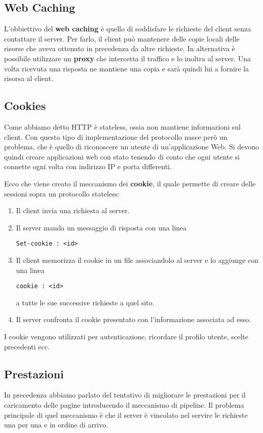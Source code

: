 \subsection{Web Caching}
L'obbiettivo del \textbf{web caching} è quello di soddisfare le 
richieste del client senza contattare il server. Per farlo, il client 
può mantenere delle copie locali delle risorse che aveva ottenuto in 
precedenza da altre richieste.
In alternativa è possibile utilizzare un \textbf{proxy} che intercetta 
il traffico e lo inoltra al server. Una volta ricevuta una risposta ne 
mantiene una copia e sarà quindi lui a fornire la risorsa al client.

\subsection{Cookies}
Come abbiamo detto HTTP è stateless, ossia non mantiene informazioni 
sul client. Con questo tipo di implementazione del protocollo nasce 
però un problema, che è quello di riconoscere un utente di 
un'applicazione Web. Si devono quindi creare applicazioni web con stato
tenendo di conto che ogni utente si connette ogni volta con indirizzo 
IP e porta differenti.

Ecco che viene creato il meccanismo dei \textbf{cookie}, il quale 
permette di creare delle sessioni sopra un protocollo stateless:
\begin{enumerate}
	\item Il client invia una richiesta al server.
	\item Il server manda un messaggio di risposta con una linea
		\begin{center} \verb|Set-cookie : <id>| \end{center}
	\item Il client memorizza il cookie in un file associandolo al 
		server e lo aggiunge con una linea
		\begin{center}
			\verb|cookie : <id>|
		\end{center}
		a tutte le sue successive richieste a quel sito.
	\item Il server confronta il cookie presentato con l'informazione 
		associata ad esso.
\end{enumerate}
I cookie vengono utilizzati per autenticazione, ricordare il profilo 
utente, scelte precedenti ecc.

\subsection{Prestazioni}
In precedenza abbiamo parlato del tentativo di migliorare le 
prestazioni per il caricamento delle pagine introducendo il meccanismo 
di pipeline. Il problema principale di quel meccanismo è che il server 
è vincolato nel servire le richieste una per una e in ordine di arrivo.

